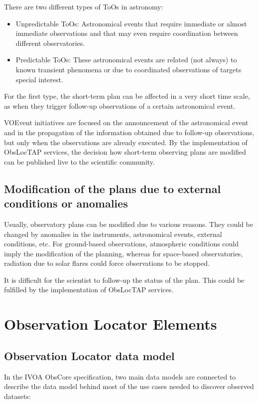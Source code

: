 \documentclass[11pt,a4paper]{ivoa}
\begin{document}
There are two different types of ToOs in astronomy:
\begin{itemize}
	\item{Unpredictable ToOs: Astronomical events that require immediate or almost
  immediate observations and that may even require coordination between
  different observatories.}

	\item{Predictable ToOs: These astronomical events are related (not always) to
  known transient phenomena or due to coordinated observations of targets
  special interest.}

\end{itemize}

For the first type, the short-term plan can be affected in a very short time
scale, as when they trigger follow-up observations of a certain astronomical
event.

VOEvent initiatives are focused on the announcement of the astronomical event
and in the propagation of the information obtained due to follow-up
observations, but only when the observations are already executed. By the
implementation of ObsLocTAP services, the decision how short-term observing
plans are modified can be published live to the scientific community.

\subsection{Modification of the plans due to external conditions or anomalies}
Usually, observatory plans can be modified due to various reasons. They could be
changed by anomalies in the instruments, astronomical events, external
conditions, etc.
For ground-based observations, atmospheric conditions could imply
the modification of the planning, whereas for space-based observatories,
radiation due to solar flares could force observations to be stopped.

It is difficult for the scientist to follow-up the status of the plan. This
could be fulfilled by the implementation of ObsLocTAP services.

\section{Observation Locator Elements}
\subsection{Observation Locator data model }
In the IVOA ObsCore specification, two main data models are connected to
describe the data model behind most of the use cases needed to discover observed
datasets:
\end{document}
